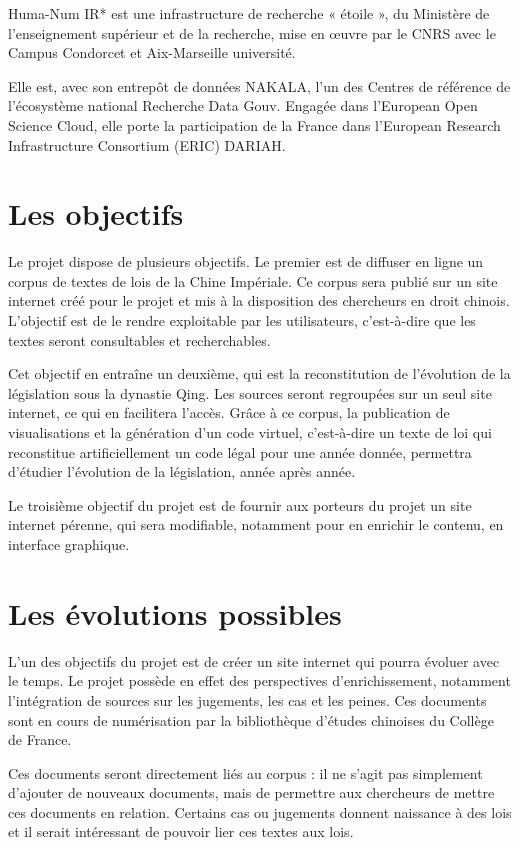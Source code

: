 Huma-Num IR* est une infrastructure de recherche « étoile », du Ministère de l’enseignement supérieur et de la recherche, mise en œuvre par le CNRS avec le Campus Condorcet et Aix-Marseille université. 

Elle est, avec son entrepôt de données NAKALA, l’un des Centres de référence de l’écosystème national Recherche Data Gouv. Engagée dans l’European Open Science Cloud, elle porte la participation de la France dans l’European Research Infrastructure Consortium (ERIC) DARIAH.
\newpage

\section*{Les objectifs}
Le projet \COREL dispose de plusieurs objectifs. Le premier est de diffuser en ligne un corpus de textes de lois de la Chine Impériale. Ce corpus sera publié sur un site internet créé pour le projet et mis à la disposition des chercheurs en droit chinois. L’objectif est de le rendre exploitable par les utilisateurs, c’est-à-dire que les textes seront consultables et recherchables. 

Cet objectif en entraîne un deuxième, qui est la reconstitution de l’évolution de la législation sous la dynastie Qing. Les sources seront regroupées sur un seul site internet, ce qui en facilitera l’accès. Grâce à ce corpus, la publication de visualisations et la génération d’un \og code virtuel\fg, c’est-à-dire un texte de loi qui reconstitue artificiellement un code légal pour une année donnée, permettra d’étudier l’évolution de la législation, année après année. 

Le troisième objectif du projet est de fournir aux porteurs du projet un site internet pérenne, qui sera modifiable, notamment pour en enrichir le contenu, en interface graphique.
\newpage
\section*{Les évolutions possibles}
L’un des objectifs du projet est de créer un site internet qui pourra évoluer avec le temps. Le projet \COREL possède en effet des perspectives d’enrichissement, notamment l’intégration de sources sur les jugements, les cas et les peines. Ces documents sont en cours de numérisation par la bibliothèque d’études chinoises du Collège de France. 

Ces documents seront directement liés au corpus : il ne s’agit pas simplement d’ajouter de nouveaux documents, mais de permettre aux chercheurs de mettre ces documents en relation. Certains cas ou jugements donnent naissance à des lois et il serait intéressant de pouvoir lier ces textes aux lois. 

